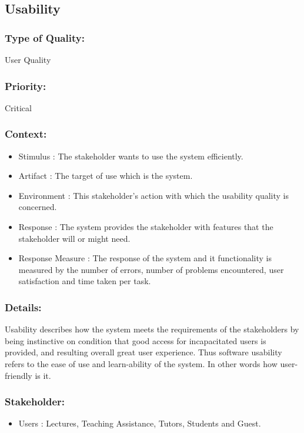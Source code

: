 \documentclass[11pt]{article}
\begin{document}
		
	\subsection{Usability }
		
		\subsubsection{Type of Quality:}
			\textbf{} User Quality
		
		\subsubsection{Priority:}
		\textbf{} Critical

		\subsubsection{Context:}
			\begin{itemize}
				\item Stimulus : The stakeholder wants to use the system efficiently.
				\item Artifact : The target of use which is the system.
				\item Environment : This stakeholder’s action with which the usability quality is concerned.
				\item Response : The system provides the stakeholder with features that the stakeholder will or might need.
				\item Response Measure : The response of the system and it functionality is measured by the number of errors, number of problems encountered, user satisfaction and time taken per task.
			\end{itemize}
		
		\subsubsection{Details:}
			\textbf{}Usability describes how the system meets the requirements of the stakeholders by being instinctive on condition that good access for incapacitated users is provided, and resulting overall great user experience. Thus software usability refers to the ease of use and learn-ability of the system. In other words how user-friendly is it.  
		
		\subsubsection{Stakeholder:}
			\begin{itemize}
				\item Users : Lectures, Teaching Assistance, Tutors, Students and Guest.
			\end{itemize}
				
\end{document}
